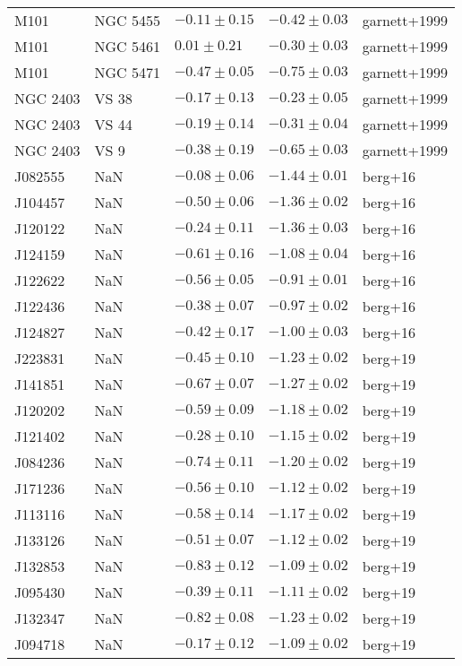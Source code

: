 \documentclass[11pt]{article}
\begin{document}
\begin{longtable}{lllll}
M101 & NGC 5455 & $-0.11 \pm 0.15$ & $-0.42 \pm 0.03$ & garnett+1999 \\
M101 & NGC 5461 & $0.01 \pm 0.21$ & $-0.30 \pm 0.03$ & garnett+1999 \\
M101 & NGC 5471 & $-0.47 \pm 0.05$ & $-0.75 \pm 0.03$ & garnett+1999 \\
NGC 2403 & VS 38 & $-0.17 \pm 0.13$ & $-0.23 \pm 0.05$ & garnett+1999 \\
NGC 2403 & VS 44 & $-0.19 \pm 0.14$ & $-0.31 \pm 0.04$ & garnett+1999 \\
NGC 2403 & VS 9 & $-0.38 \pm 0.19$ & $-0.65 \pm 0.03$ & garnett+1999 \\
J082555 & NaN & $-0.08 \pm 0.06$ & $-1.44 \pm 0.01$ & berg+16 \\
J104457 & NaN & $-0.50 \pm 0.06$ & $-1.36 \pm 0.02$ & berg+16 \\
J120122 & NaN & $-0.24 \pm 0.11$ & $-1.36 \pm 0.03$ & berg+16 \\
J124159 & NaN & $-0.61 \pm 0.16$ & $-1.08 \pm 0.04$ & berg+16 \\
J122622 & NaN & $-0.56 \pm 0.05$ & $-0.91 \pm 0.01$ & berg+16 \\
J122436 & NaN & $-0.38 \pm 0.07$ & $-0.97 \pm 0.02$ & berg+16 \\
J124827 & NaN & $-0.42 \pm 0.17$ & $-1.00 \pm 0.03$ & berg+16 \\
J223831 & NaN & $-0.45 \pm 0.10$ & $-1.23 \pm 0.02$ & berg+19 \\
J141851 & NaN & $-0.67 \pm 0.07$ & $-1.27 \pm 0.02$ & berg+19 \\
J120202 & NaN & $-0.59 \pm 0.09$ & $-1.18 \pm 0.02$ & berg+19 \\
J121402 & NaN & $-0.28 \pm 0.10$ & $-1.15 \pm 0.02$ & berg+19 \\
J084236 & NaN & $-0.74 \pm 0.11$ & $-1.20 \pm 0.02$ & berg+19 \\
J171236 & NaN & $-0.56 \pm 0.10$ & $-1.12 \pm 0.02$ & berg+19 \\
J113116 & NaN & $-0.58 \pm 0.14$ & $-1.17 \pm 0.02$ & berg+19 \\
J133126 & NaN & $-0.51 \pm 0.07$ & $-1.12 \pm 0.02$ & berg+19 \\
J132853 & NaN & $-0.83 \pm 0.12$ & $-1.09 \pm 0.02$ & berg+19 \\
J095430 & NaN & $-0.39 \pm 0.11$ & $-1.11 \pm 0.02$ & berg+19 \\
J132347 & NaN & $-0.82 \pm 0.08$ & $-1.23 \pm 0.02$ & berg+19 \\
J094718 & NaN & $-0.17 \pm 0.12$ & $-1.09 \pm 0.02$ & berg+19 \\

\end{longtable}
\end{document}
